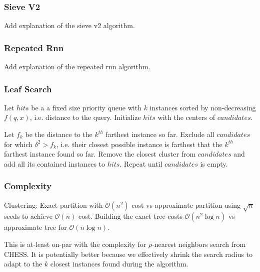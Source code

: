 \subsubsection{Sieve V2}
\label{subsubsec:methods:knn-search:sieve-v2}
Add explanation of the sieve v2 algorithm.

\subsubsection{Repeated Rnn}
\label{subsubsec:methods:knn-search:repeated-rnn}
Add explanation of the repeated rnn algorithm.

\subsubsection{Leaf Search}
\label{subsubsec:methods:knn-search:leaf-search}

Let $hits$ be a a fixed size priority queue with $k$ instances sorted by non-decreasing $f(q, x)$, i.e. distance to the query.
Initialize $hits$ with the centers of $candidates$.

Let $f_k$ be the distance to the $k^{th}$ farthest instance so far.
Exclude all $candidates$ for which $\delta^2 > f_k$, i.e. their closest possible instance is farthest that the $k^{th}$ farthest instance found so far.
Remove the closest cluster from $candidates$ and add all its contained instances to $hits$.
Repeat until $candidates$ is empty.

\subsubsection{Complexity}
\label{subsubsec:methods:knn-search:complexity}

Clustering: Exact partition with $\mathcal{O}(n^2)$ cost vs approximate partition using $\sqrt{n}$ seeds to achieve $\mathcal{O}(n)$ cost.
Building the exact tree costs $\mathcal{O}(n^2 \log n)$ vs approximate tree for $\mathcal{O}(n \log n)$.

This is at-least on-par with the complexity for $\rho$-nearest neighbors search from CHESS.
It is potentially better because we effectively shrink the search radius to adapt to the $k$ closest instances found during the algorithm.
